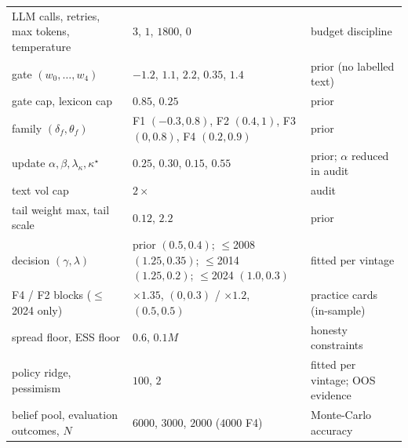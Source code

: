 \begin{center}
\begin{longtable}{p{}p{}p{}}
LLM calls, retries, max tokens, temperature & $3$, $1$, $1800$, $0$ & budget discipline\\
gate $(w_0,\dots,w_4)$ & $-1.2$, $1.1$, $2.2$, $0.35$, $1.4$ & prior (no labelled text)\\
gate cap, lexicon cap & $0.85$, $0.25$ & prior\\
family $(\delta_f,\theta_f)$ & F1 $(-0.3,0.8)$, F2 $(0.4,1)$, F3 $(0,0.8)$, F4 $(0.2,0.9)$ & prior\\
update $\alpha,\beta,\lambda_\kappa,\kappa^\star$ & $0.25$, $0.30$, $0.15$, $0.55$ & prior; $\alpha$ reduced in audit\\
text vol cap & $2\times$ & audit\\
tail weight max, tail scale & $0.12$, $2.2$ & prior\\
decision $(\gamma,\lambda)$ & prior $(0.5,0.4)$; $\le$2008 $(1.25,0.35)$; $\le$2014 $(1.25,0.2)$; $\le$2024 $(1.0,0.3)$ & fitted per vintage\\
F4 / F2 blocks ($\le$2024 only) & $\times1.35$, $(0,0.3)$ / $\times1.2$, $(0.5,0.5)$ & practice cards (in-sample)\\
spread floor, ESS floor & $0.6$, $0.1M$ & honesty constraints\\
policy ridge, pessimism & $100$, $2$ & fitted per vintage; OOS evidence\\
belief pool, evaluation outcomes, $N$ & $6000$, $3000$, $2000$ ($4000$ F4) & Monte-Carlo accuracy\\
\bottomrule
\end{longtable}
\end{center}
